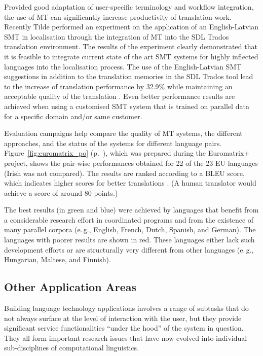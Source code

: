 \begin{multicols}{2}
Provided good adaptation of user-specific terminology and workflow integration, the use of MT can significantly increase productivity of translation work.
Recently Tilde performed an experiment on the application of an English-Latvian SMT in localisation through the integration of MT into the SDL Trados translation environment.
The results of the experiment clearly demonstrated that it is feasible to integrate current state of the art SMT systems for highly inflected languages into the localisation process.
The use of the English-Latvian SMT suggestions in addition to the translation memories in the SDL Trados tool lead to the increase of translation performance by 32.9\% while maintaining an acceptable quality of the translation \cite{Meta35}.
Even better performance results are achieved when using a customised SMT system that is trained on parallel data for a specific domain and/or same customer. 

Evaluation campaigns help compare the quality of MT systems, the different approaches, and the status of the systems for different language pairs.
Figure~\ref{fig:euromatrix_po} (p.~\pageref{fig:euromatrix_po}), which was prepared during the Euromatrix+ project, shows the pair-wise performances obtained for 22 of the 23 EU languages (Irish was not compared).
The results are ranked according to a BLEU score, which indicates higher scores for better translations \cite{Meta36}.
(A human translator would achieve a score of around 80 points.) 

The best results (in green and blue) were achieved by languages that benefit from a considerable research effort in coordinated programs and from the existence of many parallel corpora (e.\,g., English, French, Dutch, Spanish, and German).
The languages with poorer results are shown in red.
These languages either lack such development efforts or are structurally very different from other languages (e.\,g., Hungarian, Maltese, and Finnish).

\subsection{Other Application Areas}

Building language technology applications involves a range of subtasks that do not always surface at the level of interaction with the user, but they provide significant service functionalities ``under the hood'' of the system in question.  They all form important research issues that have now evolved into individual sub-disciplines of computational linguistics.


\end{multicols}
